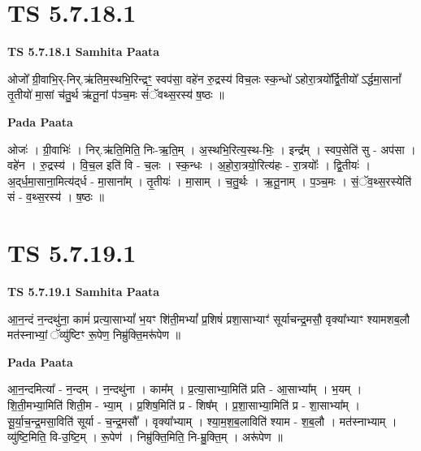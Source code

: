 \documentclass[17pt]{extarticle}
\begin{document}
\section*{ TS 5.7.18.1 }

\textbf{TS 5.7.18.1 } \newline
\textbf{Samhita Paata} \newline

ओजो᳚ ग्री॒वाभि॒र्-निर्.ऋ॑तिम॒स्थभि॒रिन्द्रꣳ॒॒ स्वप॑सा॒ वहे॑न रु॒द्रस्य॑ विच॒लः स्क॒न्धो॑ ऽहोरा॒त्रयो᳚र्द्वि॒तीयो᳚ ऽर्द्धमा॒सानां᳚ तृ॒तीयो॑ मा॒सां च॑तु॒र्थ ऋ॑तू॒नां प॑ञ्च॒मः सं॑ॅवथ्स॒रस्य॑ ष॒ष्ठः ॥ \newline

\textbf{Pada Paata} \newline

ओजः॑ । ग्री॒वाभिः॑ । निर्.ऋ॑ति॒मिति॒ निः-ऋ॒ति॒म् । अ॒स्थभि॒रित्य॒स्थ-भिः॒ । इन्द्र᳚म् । स्वप॒सेति॑ सु - अप॑सा । वहे॑न । रु॒द्रस्य॑ । वि॒च॒ल इति॑ वि - च॒लः । स्क॒न्धः । अ॒हो॒रा॒त्रयो॒रित्य॑हः - रा॒त्रयोः᳚ । द्वि॒तीयः॑ । अ॒द्‌र्ध॒मा॒साना॒मित्य॑द्‌र्ध - मा॒साना᳚म् । तृ॒तीयः॑ । मा॒साम् । च॒तु॒र्थः । ऋ॒तू॒नाम् । प॒ञ्च॒मः । सं॒ॅव॒थ्स॒रस्येति॑ सं - व॒थ्स॒रस्य॑ । ष॒ष्ठः ॥  \newline




\section*{ TS 5.7.19.1 }

\textbf{TS 5.7.19.1 } \newline
\textbf{Samhita Paata} \newline

आ॒न॒न्दं न॒न्दथु॑ना॒ कामं॑ प्रत्या॒साभ्यां᳚ भ॒यꣳ शि॑ती॒मभ्यां᳚ प्र॒शिषं॑ प्रशा॒साभ्याꣳ॑ सूर्याचन्द्र॒मसौ॒ वृक्या᳚भ्याꣳ श्यामशब॒लौ मत॑स्नाभ्यां॒ ॅव्यु॑ष्टिꣳ रू॒पेण॒ निम्रु॑क्ति॒मरू॑पेण ॥ \newline

\textbf{Pada Paata} \newline

आ॒न॒न्दमित्या᳚ - न॒न्दम् । न॒न्दथु॑ना । काम᳚म् । प्र॒त्या॒साभ्या॒मिति॑ प्रति - आ॒साभ्या᳚म् । भ॒यम् । शि॒ती॒मभ्या॒मिति॑ शिती॒म - भ्या॒म् । प्र॒शिष॒मिति॑ प्र - शिष᳚म् । प्र॒शा॒साभ्या॒मिति॑ प्र - शा॒साभ्या᳚म् । सू॒र्या॒च॒न्द्र॒मसा॒विति॑ सूर्या - च॒न्द्र॒मसौ᳚ । वृक्या᳚भ्याम् । श्या॒म॒श॒ब॒लाविति॑ श्याम - श॒ब॒लौ । मत॑स्नाभ्याम् । व्यु॑ष्टि॒मिति॒ वि-उ॒ष्टि॒म् । रू॒पेण॑ । निम्रु॑क्ति॒मिति॒ नि-म्रु॒क्ति॒म् । अरू॑पेण ॥  \newline
\end{document}
